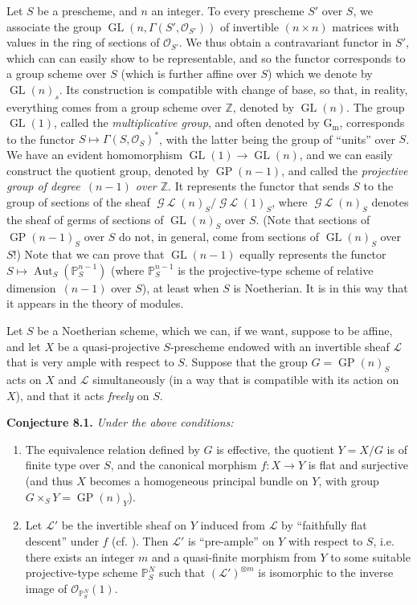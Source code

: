 \documentclass{article}
\newenvironment{itenv}[1]
  {\phantomsection\par\medskip\noindent\textbf{#1.}\itshape}
  {\medskip}
\newcommand{\scr}[1]{{\mathscr{#1}}}
\renewcommand{\cal}[1]{{\mathcal{#1}}}
\newcommand{\Gm}{\mathrm{G}_\mathrm{m}}
\DeclareMathOperator{\GL}{GL}
\DeclareMathOperator{\sGL}{\mathscr{G}\!\!\mathscr{L}}
\DeclareMathOperator{\GP}{GP}
\DeclareMathOperator{\Aut}{Aut}
\newcommand{\oldpage}[1]{\marginpar{\footnotesize$\Big\vert$ \textit{p.~#1}}}
\begin{document}
Let $S$ be a prescheme, and $n$ an integer.
To every prescheme $S'$ over $S$, we associate the group $\GL(n,\Gamma(S',\cal{O}_{S'}))$ of invertible $(n\times n)$ matrices with values in the ring of sections of $\cal{O}_{S'}$.
We thus obtain a contravariant functor in $S'$, which can can easily show to be representable, and so the functor corresponds to a group scheme over $S$ (which is further affine over $S$) which we denote by $\GL(n)_s$.
Its construction is compatible with change of base, so that, in reality, everything comes from a group scheme over $\mathbb{Z}$, denoted by $\GL(n)$.
The group $\GL(1)$, called the \emph{multiplicative group}, and often denoted by $\Gm$, corresponds to the functor $S\mapsto\Gamma(S,\cal{O}_S)^*$, with the latter being the group of ``units'' over $S$.
We have an evident homomorphism $\GL(1)\to\GL(n)$, and we can easily construct the quotient group, denoted by $\GP(n-1)$, and called the \emph{projective group of degree~$(n-1)$ over $\mathbb{Z}$}.
It represents the functor that sends $S$ to the group of sections of the sheaf $\sGL(n)_S/\sGL(1)_S$, where $\sGL(n)_S$ denotes the sheaf of germs of sections of $\GL(n)_S$ over $S$.
(Note that sections of $\GP(n-1)_S$ over $S$ do not, in general, come from sections of $\GL(n)_S$ over $S$!)
Note that we can prove that $\GL(n-1)$ equally represents the functor $S\mapsto\Aut_S(\mathbb{P}_S^{n-1})$ (where $\mathbb{P}_S^{n-1}$ is the projective-type scheme of relative dimension~$(n-1)$ over $S$), at least when $S$ is Noetherian.
It is in this way that it appears in the theory of modules.

Let $S$ be a Noetherian scheme, which we can, if we want, suppose to be affine, and let $X$ be a quasi-projective $S$-prescheme endowed with an invertible sheaf $\scr{L}$ that is very ample with respect to $S$.
Suppose that the group $G=\GP(n)_S$ acts on $X$ and $\scr{L}$ simultaneously (in a way that is compatible with its action on $X$), and that it acts \emph{freely} on $S$.

\oldpage{212-19}
\begin{itenv}{Conjecture 8.1}
  Under the above conditions:
  \begin{enumerate}
    \item The equivalence relation defined by $G$ is effective, the quotient $Y=X/G$ is of finite type over $S$, and the canonical morphism $f\colon X\to Y$ is flat and surjective (and thus $X$ becomes a homogeneous principal bundle on $Y$, with group $G\times_S Y=\GP(n)_Y$).
    \item Let $\scr{L}'$ be the invertible sheaf on $Y$ induced from $\scr{L}$ by ``faithfully flat descent'' under $f$ (cf. \cite[\S B, Theorem~1]{1}).
      Then $\scr{L}'$ is ``pre-ample'' on $Y$ with respect to $S$, i.e. there exists an integer $m$ and a quasi-finite morphism from $Y$ to some suitable projective-type scheme $\mathbb{P}_S^N$ such that $(\scr{L}')^{\otimes m}$ is isomorphic to the inverse image of $\cal{O}_{\mathbb{P}_S^N}(1)$.
  \end{enumerate}
\end{itenv}
\end{document}
